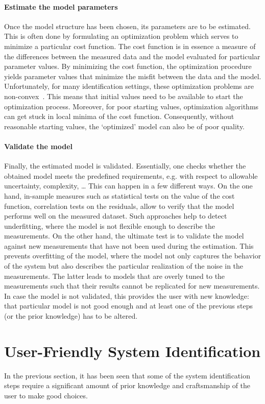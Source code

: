 \paragraph{Estimate the model parameters}
Once the model structure has been chosen, its parameters are to be estimated.
This is often done by formulating an optimization problem which serves to minimize a particular cost function.
The cost function is in essence a measure of the differences between the measured data and the model evaluated for particular parameter values.
By minimizing the cost function, the optimization procedure yields parameter values that minimize the misfit between the data and the model.
Unfortunately, for many identification settings, these optimization problems are non-convex~\citep{Boyd2004}.
This means that initial values need to be available to start the optimization process.
Moreover, for poor starting values, optimization algorithms can get stuck in local minima of the cost function.
Consequently, without reasonable starting values, the `optimized' model can also be of poor quality. 


\paragraph{Validate the model}
Finally, the estimated model is validated.
Essentially, one checks whether the obtained model meets the predefined requirements, e.g. with respect to allowable uncertainty, complexity, \ldots
This can happen in a few different ways.
On the one hand, in-sample measures such as statistical tests on the value of the cost function, correlation tests on the residuals,  allow to verify that the model performs well on the measured dataset.
Such approaches help to detect underfitting, where the model is not flexible enough to describe the measurements.
On the other hand, the ultimate test is to validate the model against new measurements that have not been used during the estimation.
This prevents overfitting of the model, where the model not only captures the behavior of the system but also describes the particular realization of the noise in the measurements.
The latter leads to models that are overly tuned to the measurements such that their results cannot be replicated for new measurements.
In case the model is not validated, this provides the user with new knowledge: that particular model is not good enough and at least one of the previous steps (or the prior knowledge) has to be altered.

\newpage
\section{User-Friendly System Identification}
In the previous section, it has been seen that some of the system identification steps require a significant amount of prior knowledge and craftsmanship of the user to make good choices.


